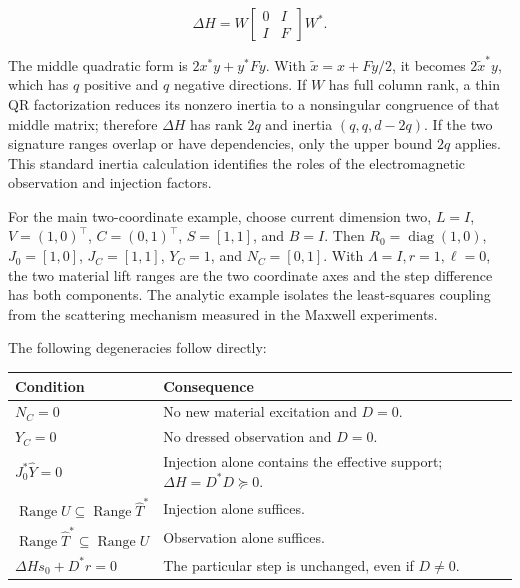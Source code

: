 \documentclass[11pt]{article}
\begin{document}
\[
\Delta H=W\begin{bmatrix}0&I\\I&F\end{bmatrix}W^*. \tag{S10}
\]

The middle quadratic form is \(2x^*y+y^*Fy\). With \(\widetilde x=x+Fy/2\), it becomes \(2\widetilde x^*y\), which has \(q\) positive and \(q\) negative directions. If \(W\) has full column rank, a thin QR factorization reduces its nonzero inertia to a nonsingular congruence of that middle matrix; therefore \(\Delta H\) has rank \(2q\) and inertia \((q,q,d-2q)\). If the two signature ranges overlap or have dependencies, only the upper bound \(2q\) applies. This standard inertia calculation identifies the roles of the electromagnetic observation and injection factors.

For the main two-coordinate example, choose current dimension two, \(L=I\), \(V=(1,0)^\top\), \(C=(0,1)^\top\), \(S=[1,1]\), and \(B=I\). Then \(R_0=\operatorname{diag}(1,0)\), \(J_0=[1,0]\), \(J_C=[1,1]\), \(Y_C=1\), and \(N_C=[0,1]\). With \(\Lambda=I,r=1,\ell=0\), the two material lift ranges are the two coordinate axes and the step difference has both components. The analytic example isolates the least-squares coupling from the scattering mechanism measured in the Maxwell experiments.

The following degeneracies follow directly:

\begin{table}[tbp]\centering\footnotesize\setlength{\tabcolsep}{3pt}
\begin{tabularx}{\linewidth}{lX}\toprule
Condition & Consequence \\\midrule
\(N_C=0\) & No new material excitation and \(D=0\). \\
\(Y_C=0\) & No dressed observation and \(D=0\). \\
\(J_0^*\widehat Y=0\) & Injection alone contains the effective support; \(\Delta H=D^*D\succeq0\). \\
\(\operatorname{Range}U\subseteq\operatorname{Range}\widehat T^*\) & Injection alone suffices. \\
\(\operatorname{Range}\widehat T^*\subseteq\operatorname{Range}U\) & Observation alone suffices. \\
\(\Delta Hs_0+D^*r=0\) & The particular step is unchanged, even if \(D\ne0\). \\
\bottomrule\end{tabularx}
\end{table}
\end{document}
